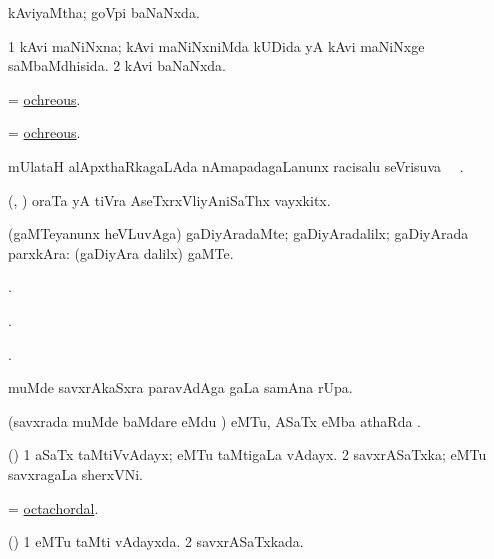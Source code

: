 \bentry
{}
\gl{\gu}
\bmng
kAviyaMtha; goVpi baNaNxda. 
\emng
\eentry

\bentry
{}
\gl{\gu}
\bmng
\bnum
\num{1} kAvi maNiNxna; kAvi maNiNxniMda kUDida yA kAvi maNiNxge saMbaMdhisida. 
\num{2} kAvi baNaNxda. 
\enum
\emng
\eentry

\bentry
{}
\gl{\gu}
\bmng
= \hyperlink{ochreous}{ochreous}. 
\emng
\eentry

\bentry
{}
\gl{\gu}
\bmng
= \hyperlink{ochreous}{ochreous}. 
\emng
\eentry

\bentry
{}
\gl{\uparx}
\bmng
mUlataH alApxthaRkagaLAda nAmapadagaLanunx racisalu seVrisuva \uparx\ \udA\ . 
\emng
\eentry

\bentry
{}
\gl{\nA}
\bmng
(\AseTxrXV, \ashi) oraTa yA tiVra AseTxrxVliyAniSaThx vayxkitx. 
\emng
\eentry

\bentry
{}
\gl{\kirxvi}
\bmng
(gaMTeyanunx heVLuvAga) gaDiyAradaMte; gaDiyAradalilx; gaDiyArada parxkAra:  (gaDiyAra dalilx)  gaMTe. 
\emng
\eentry

\bentry
{}
\gl{\saMkiSx}
\bmng
{}. 
\emng
\eentry

\bentry
{}
\gl{\saMkiSx}
\bmng
{}. 
\emng
\eentry

\bentry
{}
\gl{\saMkiSx}
\bmng
{}. 
\emng
\eentry

\bentry
{}
\gl{\sapUpa}
\bmng
muMde savxrAkaSxra paravAdAga  \sapUpa gaLa samAna rUpa. 
\emng
\eentry

\bentry
{}
\gl{\sapUpa}
\bmng
(savxrada muMde baMdare  eMdu \parx) eMTu, ASaTx eMba athaRda \sapUpa. 
\emng
\eentry

\bentry
{}
\gl{\nA}
\bmng
(\saM) 
\bnum
\num{1} aSaTx taMtiVvAdayx; eMTu taMtigaLa vAdayx. 
\num{2} savxrASaTxka; eMTu savxragaLa sherxVNi. 
\enum
\emng
\eentry

\bentry
{}
\gl{\gu}
\bmng
= \hyperlink{octachordal}{octachordal}. 
\emng
\eentry

\bentry
{}
\gl{\gu}
\bmng
(\saM) 
\bnum
\num{1} eMTu taMti vAdayxda. 
\num{2} savxrASaTxkada. 
\enum
\emng
\eentry


